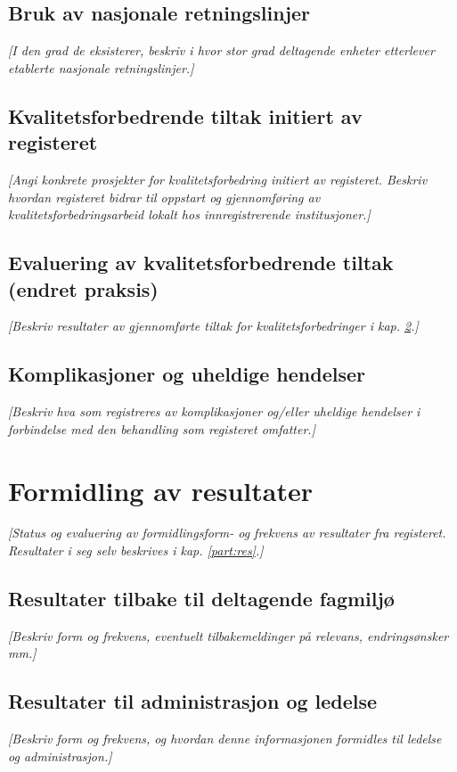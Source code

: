 \documentclass[norsk, a4paper, twocolumn]{report}
\newcommand{\guide}[1] {
	\textit{[\textcolor{guidegray}{#1}]}
	}
\begin{document}
\section{Bruk av nasjonale retningslinjer}\label{sec:retbru}
\guide{I den grad de eksisterer, beskriv i hvor stor grad deltagende enheter
etterlever etablerte nasjonale retningslinjer.}


\section{Kvalitetsforbedrende tiltak initiert av registeret}\label{sec:brures}
\guide{Angi konkrete prosjekter
for kvalitetsforbedring initiert av registeret. Beskriv
hvordan registeret bidrar til oppstart og gjennomføring
av kvalitetsforbedringsarbeid lokalt hos innregistrerende institusjoner.}

\section{Evaluering av kvalitetsforbedrende tiltak (endret praksis)}\label{sec:evakva}
\guide{Beskriv resultater av gjennomførte tiltak for kvalitetsforbedringer
i kap. \ref{sec:brures}.}

\section{Komplikasjoner og uheldige hendelser}\label{sec:kom}
\guide{Beskriv hva som registreres av komplikasjoner og/eller uheldige
hendelser i forbindelse med den behandling som registeret omfatter.}




\chapter{Formidling av resultater}\label{cha:dat}
\guide{Status og evaluering av formidlingsform- og frekvens
av resultater fra registeret.
Resultater i seg selv beskrives i kap. \ref{part:res}.}


\section{Resultater tilbake til deltagende fagmiljø}\label{sec:resfag}
\guide{Beskriv form og frekvens,  eventuelt tilbakemeldinger på relevans,
endringsønsker mm.}

\section{Resultater til administrasjon og ledelse}\label{sec:resled}
\guide{Beskriv form og frekvens, og hvordan denne
informasjonen formidles til ledelse og administrasjon.}
\end{document}
